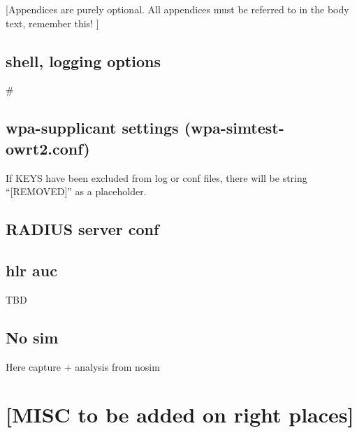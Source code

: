 \documentclass[12pt,a4paper,english]{tutthesis}
\begin{document}
\begin{otherlanguage}{english}
\markboth{\appA}{\appA}                %

[Appendices are purely optional.  All appendices must be referred to in
the body text, remember this! ]

\section{shell, logging options}
\label{sec-7-1}
\label{app:fulleap}
\lstset{basicstyle=\ttfamily,columns=fixed}
# %
\scriptsize

\normalsize



\section{wpa-supplicant settings (wpa-simtest-owrt2.conf)}
\label{sec-7-2}
\label{app:wpa-conf}
If KEYS have been excluded from log or conf files, there will be
string ``[REMOVED]''  as a placeholder.
\scriptsize

\normalsize

\section{RADIUS server conf}
\label{sec-7-3}
\label{app:radius-conf}
\scriptsize

\normalsize
\section{hlr auc}
\label{sec-7-4}

\label{app:hlraucgw}
\scriptsize

\normalsize
TBD
\scriptsize

\section{No sim}
\label{sec-7-5}
\label{app:nosim}

Here capture + analysis from nosim


\end{otherlanguage} %
\chapter{[MISC to be added on right places]}
\label{sec-8}
\end{document}
